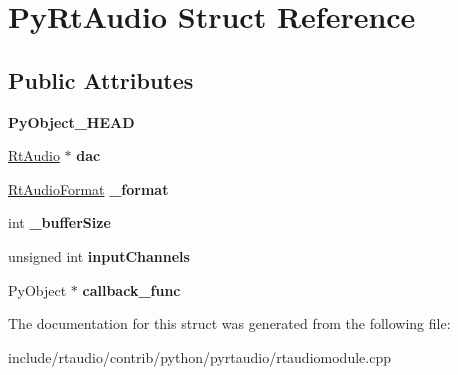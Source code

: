 \hypertarget{struct_py_rt_audio}{}\section{Py\+Rt\+Audio Struct Reference}
\label{struct_py_rt_audio}
\subsection*{Public Attributes}
\begin{DoxyCompactItemize}
\item 
{\bfseries Py\+Object\+\_\+\+H\+E\+AD}\hypertarget{struct_py_rt_audio_ab8b357041122115bfca6d21acb731fba}{}\label{struct_py_rt_audio_ab8b357041122115bfca6d21acb731fba}

\item 
\hyperlink{class_rt_audio}{Rt\+Audio} $\ast$ {\bfseries dac}\hypertarget{struct_py_rt_audio_ac9a269ad68bab25765744e7045c957fd}{}\label{struct_py_rt_audio_ac9a269ad68bab25765744e7045c957fd}

\item 
\hyperlink{_rt_audio_8h_aafca92882d25915560018873221e44b8}{Rt\+Audio\+Format} {\bfseries \+\_\+format}\hypertarget{struct_py_rt_audio_accd5afa077b10116163495872adba679}{}\label{struct_py_rt_audio_accd5afa077b10116163495872adba679}

\item 
int {\bfseries \+\_\+buffer\+Size}\hypertarget{struct_py_rt_audio_a938ca3dcd1a08cda58519e73d7f24748}{}\label{struct_py_rt_audio_a938ca3dcd1a08cda58519e73d7f24748}

\item 
unsigned int {\bfseries input\+Channels}\hypertarget{struct_py_rt_audio_ad565c86cdd9b03c821d372fae871f127}{}\label{struct_py_rt_audio_ad565c86cdd9b03c821d372fae871f127}

\item 
Py\+Object $\ast$ {\bfseries callback\+\_\+func}\hypertarget{struct_py_rt_audio_a83d1e68e3fc336256f1660586753179c}{}\label{struct_py_rt_audio_a83d1e68e3fc336256f1660586753179c}

\end{DoxyCompactItemize}


The documentation for this struct was generated from the following file\+:\begin{DoxyCompactItemize}
\item 
include/rtaudio/contrib/python/pyrtaudio/rtaudiomodule.\+cpp\end{DoxyCompactItemize}

